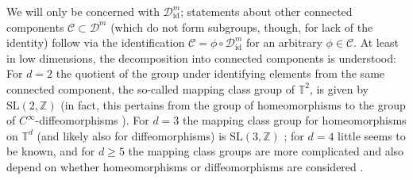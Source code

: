 \documentclass[a4paper, 12pt]{article}
\newcommand{\T}{\mathbb{T}}
\newcommand{\Z}{\mathbb{Z}}
\newcommand{\id}{\mathrm{id}}
\newcommand{\DiffSob}{\mathcal D}
\newcommand{\DiffSobId}{\mathcal D_{\id}}
\begin{document}
We will only be concerned with $\DiffSobId^m$;
statements about other connected components $\mathcal C\subset\DiffSob^m$ (which do not form subgroups, though, for lack of the identity)
follow via the identification $\mathcal C=\phi\circ\DiffSobId^m$ for an arbitrary $\phi\in\mathcal C$.
At least in low dimensions, the decomposition into connected components is understood:
For $d=2$ the quotient of the group under identifying elements from the same connected component, the so-called mapping class group of $\T^2$,
is given by $\mathrm{SL}(2,\Z)$ \cite[Thm.\,2.5]{FaMa12} (in fact, this pertains from the group of homeomorphisms to the group of $C^\infty$-diffeomorphisms \cite[\S\,1.4]{FaMa12}).
For $d=3$ the mapping class group for homeomorphisms on $\T^d$ (and likely also for diffeomorphisms) is $\mathrm{SL}(3,\Z)$ \cite{Ha76};
for $d=4$ little seems to be known, and for $d\geq5$ the mapping class groups are more complicated and also depend on whether homeomorphisms or diffeomorphisms are considered \cite[Thm.\,4.1]{Ha78}.
\end{document}

